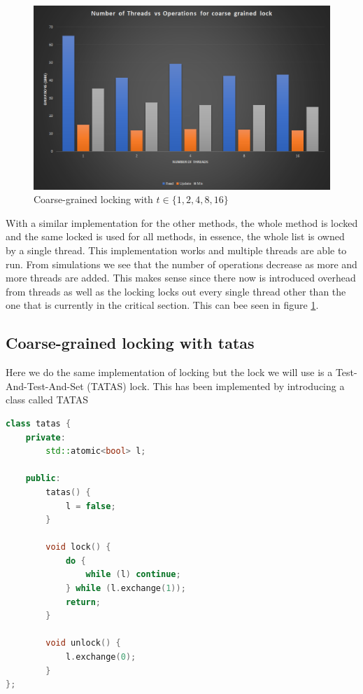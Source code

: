 \begin{figure}
    \centering
    \includegraphics[width=\linewidth]{Figures/coarsegrained.png}
    \caption{Coarse-grained locking with $t \in \{1, 2, 4, 8, 16\}$}
    \label{fig:coarsegrained}
\end{figure}

With a similar implementation for the other methods, the whole method is locked
and the same locked is used for all methods, in essence, the whole list is owned
by a single thread. This implementation works and multiple threads are able to 
run. From simulations we see that the number of operations decrease as more and
more threads are added. This makes sense since there now is introduced overhead
from threads as well as the locking locks out every single thread other than 
the one that is currently in the critical section. This can bee seen in figure
\ref{fig:coarsegrained}.

\subsection{Coarse-grained locking with tatas}
Here we do the same implementation of locking but the lock we will use is a
Test-And-Test-And-Set (TATAS) lock. This has been implemented by introducing a 
class called TATAS

\begin{lstlisting}[language=C++, caption=TATAS Class]
class tatas {
	private:
		std::atomic<bool> l;

	public:
		tatas() {
			l = false;
		}

		void lock() {
			do {
				while (l) continue;
			} while (l.exchange(1));
			return;
		}

		void unlock() {
			l.exchange(0);
		}
};
\end{lstlisting}

